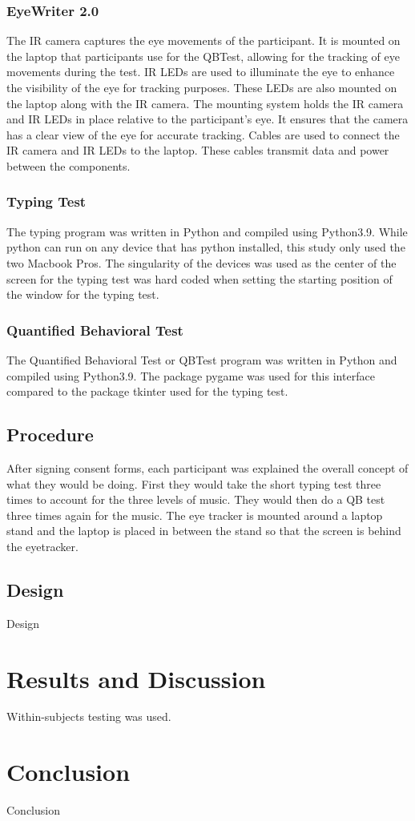 \documentclass[manuscript, screen, review]{acmart} %
\begin{document}
\subsubsection{EyeWriter 2.0}
The IR camera captures the eye movements of the participant.
It is mounted on the laptop that participants use for the QBTest, allowing for the tracking of eye movements during the test.
IR LEDs are used to illuminate the eye to enhance the visibility of the eye for tracking purposes. 
These LEDs are also mounted on the laptop along with the IR camera. 
The mounting system holds the IR camera and IR LEDs in place relative to the participant's eye. 
It ensures that the camera has a clear view of the eye for accurate tracking. 
Cables are used to connect the IR camera and IR LEDs to the laptop. These cables transmit data and power between the components.
\subsubsection{Typing Test}
The typing program was written in Python and compiled using Python3.9. While python can run on any device that has python installed, this study only used the two Macbook Pros. The singularity of the devices was used as the center of the screen for the typing test was hard coded when setting the starting position of the window for the typing test. 

\subsubsection{Quantified Behavioral Test}
The Quantified Behavioral Test or QBTest program was written in Python and compiled using Python3.9. The package pygame was used for this interface compared to the package tkinter used for the typing test.

\subsection[short]{Procedure}
After signing consent forms, each participant was explained the overall concept of what they would be doing. First they would take the short typing test three times to account for the three levels of music. They would then do a QB test three times again for the music. The eye tracker is mounted around a laptop stand and the laptop is placed in between the stand so that the screen is behind the eyetracker.

\subsection[short]{Design}
Design

\section{Results and Discussion}
Within-subjects testing was used.

\section{Conclusion}
Conclusion



\end{document}

